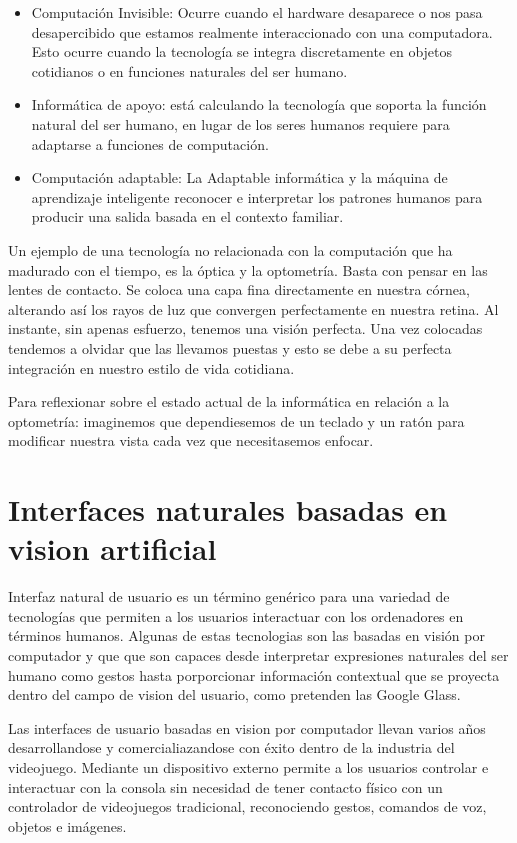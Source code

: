 \begin{itemize}
\item Computación Invisible: Ocurre cuando el hardware desaparece o nos pasa desapercibido que estamos realmente interaccionado con una computadora. Esto ocurre cuando la tecnología se integra discretamente en objetos cotidianos o en funciones naturales del ser humano.
\item Informática de apoyo:  está calculando la tecnología que soporta la función natural del ser humano, en lugar de los seres humanos requiere para adaptarse a funciones de computación.
\item Computación adaptable:  La Adaptable informática y la máquina de aprendizaje inteligente reconocer e interpretar los patrones humanos para producir una salida basada en el contexto familiar.
\end{itemize}

Un ejemplo de una tecnología no relacionada con la computación que ha madurado con el tiempo, es la óptica y la optometría. Basta con pensar en las lentes de contacto. Se coloca una capa fina directamente en nuestra córnea, alterando así los rayos de luz que convergen perfectamente en nuestra retina. Al instante, sin apenas esfuerzo, tenemos una visión perfecta. Una vez colocadas tendemos a olvidar que las llevamos puestas y esto se debe a su perfecta integración en nuestro estilo de vida cotidiana. 

Para reflexionar sobre el estado actual de la informática en relación a la optometría: imaginemos que dependiesemos de un teclado y un ratón para modificar nuestra vista cada vez que necesitasemos enfocar.

\section{Interfaces naturales basadas en vision artificial}
Interfaz natural de usuario es un término genérico para una variedad de tecnologías que permiten a los usuarios interactuar con los ordenadores en términos humanos. Algunas de estas tecnologias son las basadas en visión por computador y que que son capaces desde interpretar expresiones naturales del ser humano como gestos hasta porporcionar información contextual que se proyecta dentro del campo de vision del usuario, como pretenden las Google Glass. 

Las interfaces de usuario basadas en vision por computador llevan varios años desarrollandose y comercialiazandose con éxito dentro de la industria del videojuego. Mediante un dispositivo externo permite a los usuarios controlar e interactuar con la consola sin necesidad de tener contacto físico con un controlador de videojuegos tradicional, reconociendo gestos, comandos de voz, objetos e imágenes.

